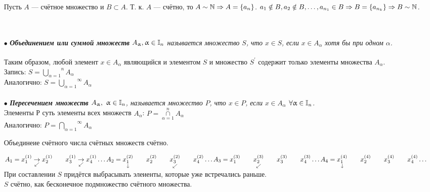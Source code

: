 \begin{Proof} Пусть $A$ --- счётное множество и $B \subset A$. Т. к. $A$ --- счётно, то $A \sim \mathbb{N} \Rightarrow A=\{a_n\}$. $a_1 \notin B, a_2 \notin B, \dots, a_{n_1} \in B \Rightarrow B=\{a_{n_k}\} \Rightarrow B \sim \mathbb{N}$.
\end{Proof}\\\\
$\bullet$ \textit{\textbf{Объединением или суммой множеств} $A_\upalpha, \upalpha \in \mathbb{I}_n$ называется множество $S$, что $x \in S$, если $x \in A_\alpha$ хотя бы при одном $\alpha$.}\\\\
Таким образом, любой элемент $x \in A_\alpha$ являющийся и элементом $S$ и множество $S^\prime$ содержит только элементы множества $A_\alpha$.\\
Запись: $S =  \overset{n}{\underset{\alpha=1}{\bigcup}} A_\alpha$\\
Аналогично: $S =  \overset{\infty}{\underset{\alpha=1}{\bigcup}} A_\alpha$\\\\
$\bullet$ \textit{\textbf{Пересечением множеств} $A_\upalpha,\ \upalpha \in \mathbb{I}_n$, называется множество $P$, что $x \in P$, если $x \in A_\alpha$  $\forall\upalpha\in \mathbb{I}_n$.}\\
Элементы Р суть элементы всех множеств $A_\alpha$: $P= \overset{n}{\underset{\alpha=1}{\cap}} A_\alpha$\\
Аналогично: $P =  \overset{\infty}{\underset{\alpha=1}{\bigcap}} A_\alpha$\\
\begin{theorem} 
	Объединеие счётного числа счётных множеств счётно.
\end{theorem}
\begin{Proof}
	$A_1 = x_1^{(1)} \underset{\swarrow}{\rightarrow} x_2^{(1)} \qquad x_3^{(1)} \underset{\swarrow}{\rightarrow} x_4^{(1)} \dotsc\\
	A_2 = {\underset{\downarrow}{x_1^{(2)}}} \qquad x_2^{(2)} \qquad{\underset{\swarrow}{x_3^{(2)}}} \qquad x_4^{(2)} \dotsc\\
	A_3 = x_1^{(3)} \qquad {\underset{\swarrow}{x_2^{(3)}}} \qquad x_3^{(3)}\qquad x_4^{(3)} \dotsc\\
	A_4 = {\underset{\downarrow}{x_1^{(4)}}} \qquad x_2^{(4)}\qquad x_3^{(4)}\qquad x_4^{(4)} \dotsc$\\
	При составлении $S$ придётся выбрасывать элеиенты, которые уже встречались раньше.\\ $S$ счётно, как бесконечное подмножество счётного множества.
\end{Proof}
